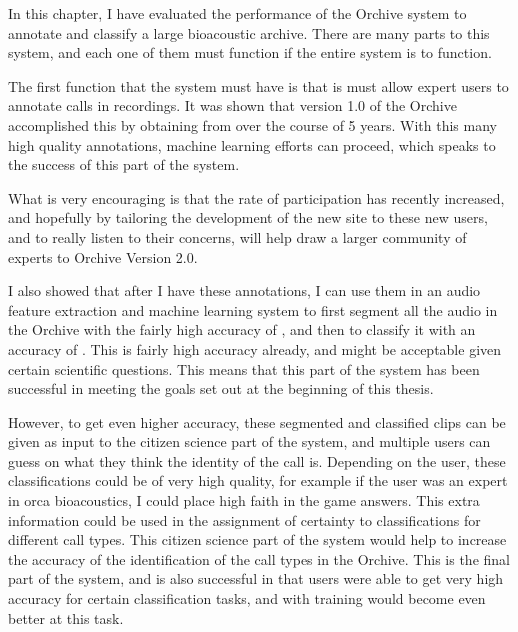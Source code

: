 \documentclass[12pt,oneside]{book}
\begin{document}
In this chapter, I have evaluated the performance of the Orchive
system to annotate and classify a large bioacoustic archive.  There
are many parts to this system, and each one of them must function if
the entire system is to function.

The first function that the system must have is that is must allow
expert users to annotate calls in recordings.  It was shown that
version 1.0 of the Orchive accomplished this by obtaining
\totalAnnotations from \totalExperts over the course of 5 years.  With
this many high quality annotations, machine learning efforts can
proceed, which speaks to the success of this part of the system.

What is very encouraging is that the rate of participation has
recently increased, and hopefully by tailoring the development of the
new site to these new users, and to really listen to their concerns,
will help draw a larger community of experts to Orchive Version 2.0.

I also showed that after I have these annotations, I can use them
in an audio feature extraction and machine learning system to first
segment all the audio in the Orchive with the fairly high accuracy of
\classificationAccuracyOBV, and then to classify it with an accuracy
of \classificationAccuracyCALLS.  This is fairly high accuracy
already, and might be acceptable given certain scientific questions.
This means that this part of the system has been successful in meeting
the goals set out at the beginning of this thesis.

However, to get even higher accuracy, these segmented and classified
clips can be given as input to the citizen science part of the system,
and multiple users can guess on what they think the identity of the
call is.  Depending on the user, these classifications could be of
very high quality, for example if the user was an expert in orca
bioacoustics, I could place high faith in the game answers.  This
extra information could be used in the assignment of certainty to
classifications for different call types.  This citizen science part of the
system would help to increase the accuracy of the identification of
the call types in the Orchive.  This is the final part of the system, and
is also successful in that users were able to get very high accuracy
for certain classification tasks, and with training would become even
better at this task.


\end{document}
